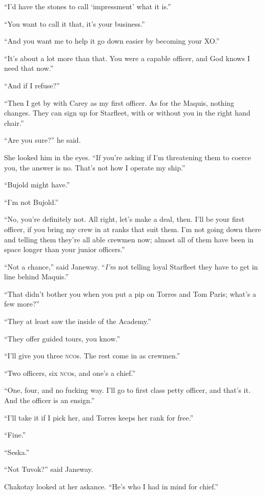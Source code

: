 \documentclass[twoside,letterpaper,12pt]{memoir}
\begin{document}
``I’d have the stones to call ‘impressment’ what it is.” 

``You want to call it that, it’s your business.” 

``And you want me to help it go down easier by becoming your XO.” 

``It’s about a lot more than that. You were a capable officer, and God knows I need that now.” 

``And if I refuse?” 

``Then I get by with Carey as my first officer. As for the Maquis, nothing changes. They can sign up for Starfleet, with or without you in the right hand chair.” 

``Are you sure?” he said. 

She looked him in the eyes. ``If you’re asking if I’m threatening them to coerce you, the answer is no. That’s not how I operate my ship.” 

``Bujold might have.” 

``I’m not Bujold.” 

``No, you’re definitely not. All right, let’s make a deal, then. I’ll be your first officer, if you bring my crew in at ranks that suit them. I’m not going down there and telling them they’re all able crewmen now; almost all of them have been in space longer than your junior officers.” 

``Not a chance,” said Janeway. ``\textit{I’m} not telling loyal Starfleet they have to get in line behind Maquis.” 

``That didn’t bother you when you put a pip on Torres and Tom Paris; what’s a few more?” 

``They at least saw the inside of the Academy.” 

``They offer guided tours, you know.” 

``I’ll give you three \textsc{nco}s. The rest come in as crewmen.” 

``Two officers, six \textsc{nco}s, and one’s a chief.” 

``One, four, and no fucking way. I’ll go to first class petty officer, and that’s it. And the officer is an ensign.” 

``I’ll take it if I pick her, and Torres keeps her rank for free.” 

``Fine.” 

``Seska.” 

``Not Tuvok?” said Janeway. 

Chakotay looked at her askance. ``He’s who I had in mind for chief.” 
\end{document}
